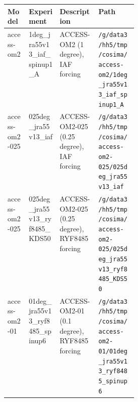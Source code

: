 
\begin{tabularx}{\linewidth}{lXXp{0.3\linewidth}}
\hline
\textbf{Model} & \textbf{Experiment} & \textbf{Description} & \textbf{Path} \\
\hline

access-om2 & 1deg_jra55v13_iaf_spinup1_A & ACCESS-OM2 (1 degree), IAF forcing & \texttt{\slash g\slash data3\slash hh5\slash tmp\slash cosima\slash access-om2\slash 1deg_jra55v13_iaf_spinup1_A}\\
access-om2-025 & 025deg_jra55v13_iaf & ACCESS-OM2-025 (0.25 degree), IAF forcing & \texttt{\slash g\slash data3\slash hh5\slash tmp\slash cosima\slash access-om2-025\slash 025deg_jra55v13_iaf}\\
access-om2-025 & 025deg_jra55v13_ryf8485_KDS50 & ACCESS-OM2-025 (0.25 degree), RYF8485 forcing & \texttt{\slash g\slash data3\slash hh5\slash tmp\slash cosima\slash access-om2-025\slash 025deg_jra55v13_ryf8485_KDS50}\\
access-om2-01 & 01deg_jra55v13_ryf8485_spinup6 & ACCESS-OM2-01 (0.1 degree), RYF8485 forcing & \texttt{\slash g\slash data3\slash hh5\slash tmp\slash cosima\slash access-om2-01\slash 01deg_jra55v13_ryf8485_spinup6}\\

\hline
\hline
\end{tabularx}
